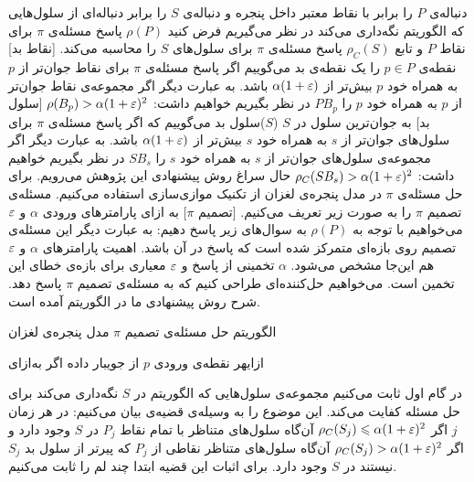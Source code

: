 دنباله‌ی $P$ را برابر با نقاط معتبر داخل پنجره و دنباله‌ی $S$ را برابر دنباله‌‌ای از سلول‌هایی که الگوریتم نگه‌داری می‌کند در نظر می‌گیریم  فرض کنید $\rho(P)$ پاسخ مسئله‌ی $\pi$ برای نقاط $P$ و تابع $\rho_C(S)$ پاسخ مسئله‌ی $\pi$ برای سلول‌های $S$ را محاسبه می‌کند. 
[نقاط بد] نقطه‌ی $p \in P$ را یک نقطه‌ی بد می‌گوییم اگر پاسخ مسئله‌ی $\pi$ برای نقاط جوان‌تر از $p$ به همراه خود $p$ بیش‌تر از $\alpha (1+\varepsilon)$ باشد. به عبارت دیگر اگر مجموعه‌ی نقاط جوان‌تر از $p$ به همراه خود $p$ را $PB_p$ در نظر بگیریم خواهیم داشت:
$ \rho(B_p) > \alpha (1+\varepsilon)^2$
[سلول بد] به جوان‌ترین سلول در $S$  ($S$)سلول بد می‌گوییم که اگر پاسخ مسئله‌ی $\pi$ برای سلول‌های جوان‌تر از $s$ به همراه خود $s$ بیش‌تر از $\alpha (1+\varepsilon)$ باشد. به عبارت دیگر اگر مجموعه‌ی سلول‌های جوان‌تر از $s$ به همراه خود $s$ را $SB_s$ در نظر بگیریم خواهیم داشت:
$ \rho_C(SB_s) > \alpha (1+\varepsilon)^2$
حال سراغ روش پیشنهادی این پژوهش می‌رویم. برای حل مسئله‌ی $\pi$ در مدل پنجره‌ی لغزان از تکنیک موازی‌سازی استفاده می‌کنیم. مسئله‌ی تصمیم $\pi$ را به صورت زیر تعریف می‌کنیم.
[تصمیم $\pi$]
به ازای پارامترهای ورودی $\alpha$ و $\varepsilon$ می‌خواهیم با توجه به $\rho(P)$ به سوال‌های زیر پاسخ دهیم:
به عبارت دیگر این مسئله‌ی تصمیم روی بازه‌ای متمرکز شده است که پاسخ در آن باشد. اهمیت پارامتر‌های $\alpha$ و $\varepsilon$ هم این‌جا مشخص می‌شود. $\alpha$ تخمینی از پاسخ  و $\varepsilon$ معیاری برای بازه‌‌ی خطای این تخمین است. می‌خواهیم حل‌کننده‌ای طراحی کنیم که به مسئله‌ی تصمیم $\pi$ پاسخ دهد.  شرح روش پیشنهادی ما در الگوریتم  آمده است.

\caption
{الگوریتم حل مسئله‌ی تصمیم $\pi$ مدل پنجره‌ی لغزان}
‌ازای{هر نقطه‌ی ورودی $p$ از جویبار داده}
 
‌اگر{}
‌به‌ازای{}

در گام اول ثابت می‌کنیم مجموعه‌ی سلول‌هایی که الگوریتم  در $S$ نگه‌داری می‌کند برای حل مسئله کفایت می‌کند. این موضوع را به وسیله‌ی قضیه‌ی  بیان می‌کنیم:
در هر زمان $j$ اگر
$\rho_C(S_j) \leqslant \alpha (1+\varepsilon)^2 $ 
آن‌‌گاه سلول‌های متناظر با تمام نقاط $P_j$ در $S$ وجود دارد و اگر
$\rho_C(S_j) > \alpha (1+\varepsilon)^2 $ 
آن‌گاه سلول‌های متناظر نقاطی از $P_j$ که پیرتر از سلول بد $S_j$ نیستند در $S$ وجود دارد.
برای اثبات این قضیه ابتدا چند لم را ثابت می‌کنیم.

